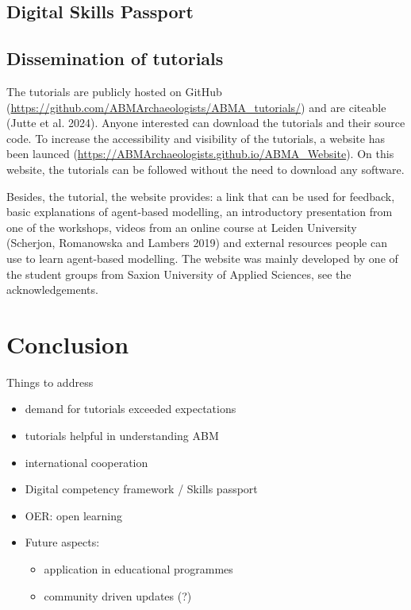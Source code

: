 \documentclass[
]{article}
\begin{document}
\hypertarget{digital-skills-passport}{%
\subsection{Digital Skills Passport}\label{digital-skills-passport}}

\hypertarget{dissemination-of-tutorials}{%
\subsection{Dissemination of tutorials}\label{dissemination-of-tutorials}}

The tutorials are publicly hosted on GitHub (\url{https://github.com/ABMArchaeologists/ABMA_tutorials/}) and are citeable (Jutte et al. 2024). Anyone interested can download the tutorials and their source code. To increase the accessibility and visibility of the tutorials, a website has been launced (\href{https://ABMArchaeologists.github.io/ABMA_Website/\#/}{https://ABMArchaeologists.github.io/ABMA\_Website}). On this website, the tutorials can be followed without the need to download any software.

Besides, the tutorial, the website provides: a link that can be used for feedback, basic explanations of agent-based modelling, an introductory presentation from one of the workshops, videos from an online course at Leiden University (Scherjon, Romanowska and Lambers 2019) and external resources people can use to learn agent-based modelling. The website was mainly developed by one of the student groups from Saxion University of Applied Sciences, see the acknowledgements.

\hypertarget{conclusion}{%
\section{Conclusion}\label{conclusion}}

Things to address

\begin{itemize}
\item
  demand for tutorials exceeded expectations
\item
  tutorials helpful in understanding ABM
\item
  international cooperation
\item
  Digital competency framework / Skills passport
\item
  OER: open learning
\item
  Future aspects:

  \begin{itemize}
  \item
    application in educational programmes
  \item
    community driven updates (?)
  \end{itemize}
\end{itemize}
\end{document}
